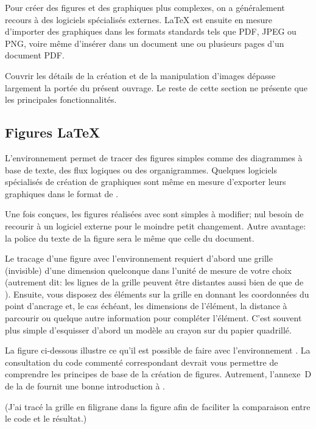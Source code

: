 Pour créer des figures et des graphiques plus complexes, on a généralement
recours à des logiciels spécialisés externes. {\LaTeX} est ensuite en
mesure d'importer des graphiques dans les formats standards tels que PDF, JPEG
ou PNG, voire même d'insérer dans un document une ou plusieurs pages
d'un document PDF.

Couvrir les détails de la création et de la manipulation d'images
dépasse largement la portée du présent ouvrage. Le reste de cette
section ne présente que les principales fonctionnalités.


\subsection{Figures {\LaTeX}}
\label{sec:tableaux:figures:picture}

L'environnement  permet de tracer des figures simples
comme des diagrammes à base de texte, des flux logiques ou des
organigrammes. Quelques logiciels spécialisés de création de
graphiques sont même en mesure d'exporter leurs graphiques dans le
format de .

Une fois conçues, les figures réalisées avec  sont
simples à modifier; nul besoin de recourir à un logiciel externe pour
le moindre petit changement. Autre avantage: la police du texte
de la figure sera le même que celle du document.

Le tracage d'une figure avec l'environnement  requiert
d'abord une grille (invisible) d'une dimension quelconque dans l'unité
de mesure de votre choix (autrement dit: les lignes de la grille
peuvent être distantes aussi bien de \code{1pt} que de \code{1cm}).
Ensuite, vous disposez des éléments sur la grille en donnant les
coordonnées du point d'ancrage et, le cas échéant, les dimensions de
l'élément, la distance à parcourir ou quelque autre information pour
compléter l'élément. C'est souvent plus simple d'esquisser d'abord un modèle au
crayon sur du papier quadrillé.

La figure ci-dessous illustre ce qu'il est possible de faire avec
l'environnement . La consultation du code commenté
correspondant devrait vous permettre de comprendre les principes de base de
la création de figures. Autrement, l'annexe~D de la %
de  fournit une bonne introduction à .

(J'ai tracé la grille en filigrane dans la figure afin de
faciliter la comparaison entre le code et le résultat.)

